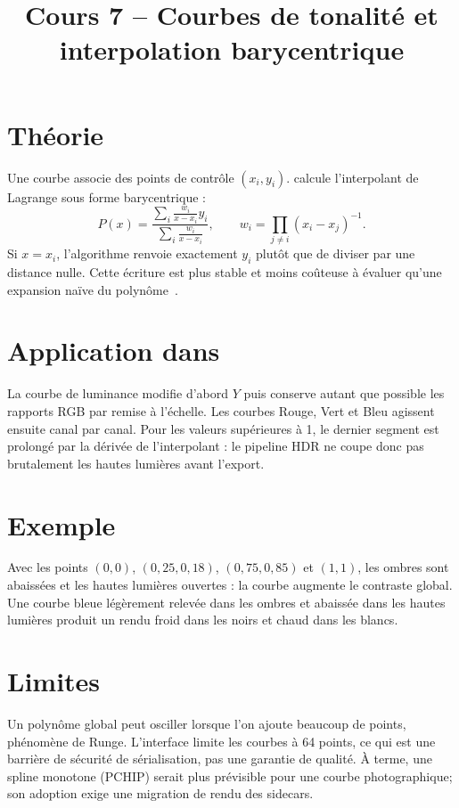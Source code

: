 
\title{Cours 7 -- Courbes de tonalité et interpolation barycentrique}


\section{Théorie}
Une courbe associe des points de contrôle $(x_i,y_i)$. \IPR{} calcule l'interpolant de Lagrange sous forme barycentrique :
\begin{equation}
P(x)=\frac{\sum_i \frac{w_i}{x-x_i}y_i}{\sum_i\frac{w_i}{x-x_i}},\qquad
w_i=\prod_{j\ne i}(x_i-x_j)^{-1}.
\end{equation}
Si $x=x_i$, l'algorithme renvoie exactement $y_i$ plutôt que de diviser par une distance nulle. Cette écriture est plus stable et moins coûteuse à évaluer qu'une expansion naïve du polynôme~\cite{berrutTrefethen}.

\section{Application dans \IPR{}}
La courbe de luminance modifie d'abord $Y$ puis conserve autant que possible les rapports RGB par remise à l'échelle. Les courbes Rouge, Vert et Bleu agissent ensuite canal par canal. Pour les valeurs supérieures à 1, le dernier segment est prolongé par la dérivée de l'interpolant : le pipeline HDR ne coupe donc pas brutalement les hautes lumières avant l'export.

\section{Exemple}
Avec les points $(0,0)$, $(0{,}25,0{,}18)$, $(0{,}75,0{,}85)$ et $(1,1)$, les ombres sont abaissées et les hautes lumières ouvertes : la courbe augmente le contraste global. Une courbe bleue légèrement relevée dans les ombres et abaissée dans les hautes lumières produit un rendu froid dans les noirs et chaud dans les blancs.

\section{Limites}
Un polynôme global peut osciller lorsque l'on ajoute beaucoup de points, phénomène de Runge. L'interface limite les courbes à 64 points, ce qui est une barrière de sécurité de sérialisation, pas une garantie de qualité. À terme, une spline monotone (PCHIP) serait plus prévisible pour une courbe photographique; son adoption exige une migration de rendu des sidecars.



